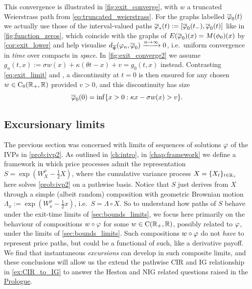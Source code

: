 This convergence is illustrated in \autoref{fig:exit_converge}, with $w$ a truncated Weierstrass path from \autoref{eq:truncated_weierstrass}. For the graphs labelled $\overline{\varphi}_0(t)$ we actually use those of the interval-valued paths $\overline{\varphi}_*(t):=[\overline{\varphi}_0(t_-),\overline{\varphi}_0(t)]$ like in \autoref{fig:function_zeros}, which coincide with the graphs of $E(\overline{\varphi}_0)(x)=M(\phi_0)(x)$ by \autoref{cor:exit_lower} and help visualise $d_{\overline{\Phi}}(\varphi_n,\overline{\varphi}_0) \xrightarrow{n\to\infty} 0$, i.e.~uniform convergence in \emph{time} over compacts in \emph{space}. In \autoref{fig:exit_converge2} we assume $g_n(t,x) := \sigma w(x) + \kappa\left(\theta t - x\right) + v = g_0(t,x)$ instead. Contrasting \autoref{eq:exit_limit} and \cite{mechkov_2015}, a discontinuity at $t=0$ is then ensured for any chosen $w\in\mathrm{C}_0(\mathbb{R}_+,\mathbb{R})$ provided $v>0$, and this discontinuity has size
\begin{equation}
    \overline{\varphi}_0(0) = \inf\{x>0: \kappa x - \sigma w(x) > v\}.
\end{equation}

\subsection{Excursionary limits}\label{sec:excursionary_limits}

The previous section was concerned with limits of sequences of solutions $\varphi$ of the IVPs in \autoref{prob:ivp2}. As outlined in \autoref{ch:intro}, in \autoref{chap:framework} we define a framework in which price processes admit the representation $S=\exp(W^\rho_X-\frac12 X)$, where the cumulative variance process $X=\{X_t\}_{t\in\mathbb{R}_+}$ here solves \autoref{prob:ivp2} on a pathwise basis. Notice that $S$ just derives from $X$ through a simple (albeit random) composition with geometric Brownian motion $\Lambda_x:=\exp(W^\rho_x-\frac12 x)$, i.e.~$S=\Lambda\circ X$. So to understand how paths of $S$ behave under the exit-time limits of \autoref{sec:bounds_limits}, we focus here primarily on the behaviour of compositions $w\circ\varphi$ for some $w\in\mathrm{C}(\mathbb{R}_+,\mathbb{R})$, possibly related to $\varphi$, under the limits of \autoref{sec:bounds_limits}. Such compositions $w\circ\varphi$ do not \emph{have} to represent price paths, but could be a functional of such, like a derivative payoff. We find that instantaneous \emph{excursions} can develop in such composite limits, and these conclusions will allow us the extend the pathwise CIR and IG relationship in \autoref{ex:CIR_to_IG} to answer the Heston and NIG related questions raised in the \hyperlink{prologue}{Prologue}.

